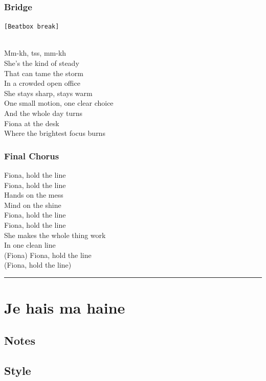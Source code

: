 \documentclass[]{article}
\begin{document}
\subsubsection{Bridge}\label{bridge-7}

\texttt{{[}Beatbox\ break{]}}\strut \\
Mm-kh, tss, mm-kh\\
She's the kind of steady\\
That can tame the storm\\
In a crowded open office\\
She stays sharp, stays warm\\
One small motion, one clear choice\\
And the whole day turns\\
Fiona at the desk\\
Where the brightest focus burns

\subsubsection{Final Chorus}\label{final-chorus}

Fiona, hold the line\\
Fiona, hold the line\\
Hands on the mess\\
Mind on the shine\\
Fiona, hold the line\\
Fiona, hold the line\\
She makes the whole thing work\\
In one clean line\\
(Fiona) Fiona, hold the line\\
(Fiona, hold the line)

\begin{center}\rule{0.5\linewidth}{0.5pt}\end{center}

\section{Je hais ma haine}\label{je-hais-ma-haine}

\subsection{Notes}\label{notes-19}

\subsection{Style}\label{style-19}
\end{document}
